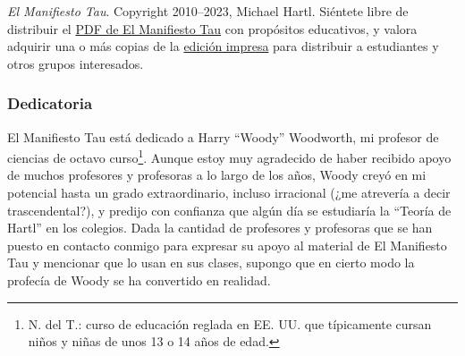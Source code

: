     \emph{El Manifiesto Tau}. Copyright 2010--2023, Michael Hartl. Siéntete libre de distribuir el \href{https://tauday.com/tau_manifesto.pdf}{PDF de El Manifiesto Tau} con propósitos educativos, y valora adquirir una o más copias de la \href{https://tauday.com/print}{edición impresa} para distribuir a estudiantes y otros grupos interesados.



\renewcommand{\thesubsubsection}{6.283185}

    \subsubsection{Dedicatoria} %
    \label{sec:dedication}

    El Manifiesto Tau está dedicado a Harry ``Woody'' Woodworth, mi profesor de ciencias de octavo curso\footnote{N. del T.: curso de educación reglada en EE. UU. que típicamente cursan niños y niñas de unos 13 o 14 años de edad.}. Aunque estoy muy agradecido de haber recibido apoyo de muchos profesores y profesoras a lo largo de los años, Woody creyó en mi potencial hasta un grado extraordinario, incluso irracional (¿me atrevería a decir trascendental?), y predijo con confianza que algún día se estudiaría la ``Teoría de Hartl'' en los colegios. Dada la cantidad de profesores y profesoras que se han puesto en contacto conmigo para expresar su apoyo al material de El Manifiesto Tau y mencionar que lo usan en sus clases, supongo que en cierto modo la profecía de Woody se ha convertido en realidad.

